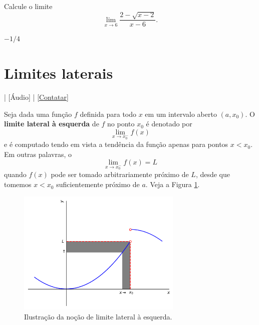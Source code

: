 \begin{exer}
  Calcule o limite
  \begin{equation}
    \lim_{x\to 6} \frac{2-\sqrt{x-2}}{x-6}.
  \end{equation}
\end{exer}
\begin{resp}
  $-1/4$
\end{resp}


\section{Limites laterais}\label{cap_lim_sec_lateral}

\begin{flushright}
  [Vídeo] | [Áudio] | \href{https://phkonzen.github.io/notas/contato.html}{[Contatar]}
\end{flushright}

Seja dada uma função $f$ definida para todo $x$ em um intervalo aberto $(a, x_0)$. O {\bf limite lateral à esquerda} de $f$ no ponto $x_0$ é denotado por
\begin{equation}
  \lim_{x\to x_0^-} f(x)
\end{equation}
e é computado tendo em vista a tendência da função apenas para pontos $x<x_0$. Em outras palavras, o
\begin{equation}
  \lim_{x\to x_0^-} f(x) = L
\end{equation}
quando $f(x)$ pode ser tomado arbitrariamente próximo de $L$, desde que tomemos $x<x_0$ suficientemente próximo de $a$. Veja a Figura \ref{fig:lim_esq}.

\begin{figure}[H]
  \centering
  \includegraphics[width=0.7\textwidth]{./cap_lim/dados/fig_lim_esq/fig_lim_esq}
  \caption{Ilustração da noção de limite lateral à esquerda.}
  \label{fig:lim_esq}
\end{figure}


